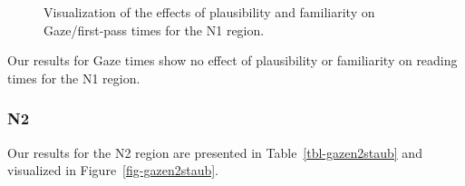 \documentclass[
  letterpaper,
  DIV=11,
  numbers=noendperiod,
  nottoc]{scrreprt}
\begin{document}
\begin{figure}[htbp]


\caption{\label{fig-gazen1staub}Visualization of the effects of
plausibility and familiarity on Gaze/first-pass times for the N1
region.}

\end{figure}%

Our results for Gaze times show no effect of plausibility or familiarity
on reading times for the N1 region.

\subsubsection{N2}\label{n2-5}

Our results for the N2 region are presented in
Table~\ref{tbl-gazen2staub} and visualized in
Figure~\ref{fig-gazen2staub}.
\end{document}
